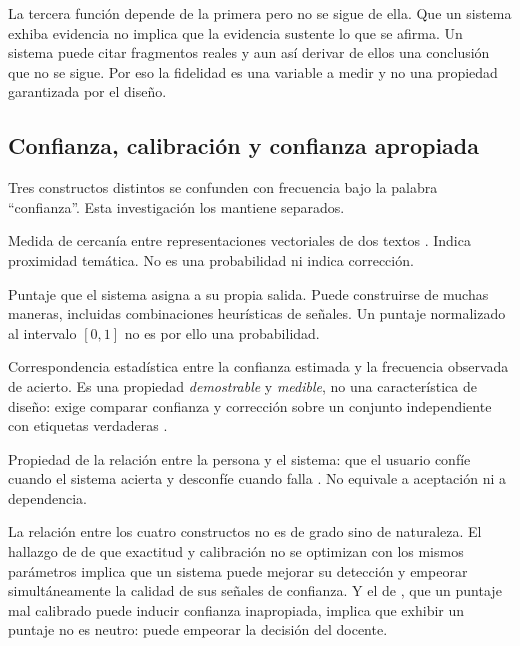 \begin{advertencia}
La tercera función depende de la primera pero no se sigue de ella. Que un sistema
exhiba evidencia no implica que la evidencia sustente lo que se afirma. Un sistema
puede citar fragmentos reales y aun así derivar de ellos una conclusión que no se
sigue. Por eso la fidelidad es una variable a medir y no una propiedad garantizada
por el diseño.
\end{advertencia}

\subsection{Confianza, calibración y confianza apropiada}
\label{sec:teo-confianza}

Tres constructos distintos se confunden con frecuencia bajo la palabra
\enquote{confianza}. Esta investigación los mantiene separados.

\begin{description}[style=nextline,leftmargin=0.8cm]
  \item[Similitud] Medida de cercanía entre representaciones vectoriales de dos
        textos \parencite{reimers2019sentencebert}. Indica proximidad temática. No es
        una probabilidad ni indica corrección.
  \item[Confianza estimada] Puntaje que el sistema asigna a su propia salida. Puede
        construirse de muchas maneras, incluidas combinaciones heurísticas de
        señales. Un puntaje normalizado al intervalo $[0,1]$ no es por ello una
        probabilidad.
  \item[Calibración] Correspondencia estadística entre la confianza estimada y la
        frecuencia observada de acierto. Es una propiedad \emph{demostrable} y
        \emph{medible}, no una característica de diseño: exige comparar confianza y
        corrección sobre un conjunto independiente con etiquetas verdaderas
        \parencite{guo2017calibration}.
  \item[Confianza apropiada] Propiedad de la relación entre la persona y el sistema:
        que el usuario confíe cuando el sistema acierta y desconfíe cuando falla
        \parencite{mehrotra2024systematic}. No equivale a aceptación ni a
        dependencia.
\end{description}

La relación entre los cuatro constructos no es de grado sino de naturaleza. El
hallazgo de \textcite{guo2017calibration} de que exactitud y calibración no se
optimizan con los mismos parámetros implica que un sistema puede mejorar su detección
y empeorar simultáneamente la calidad de sus señales de confianza. Y el de
\textcite{mehrotra2024systematic}, que un puntaje mal calibrado puede inducir
confianza inapropiada, implica que exhibir un puntaje no es neutro: puede empeorar la
decisión del docente.

